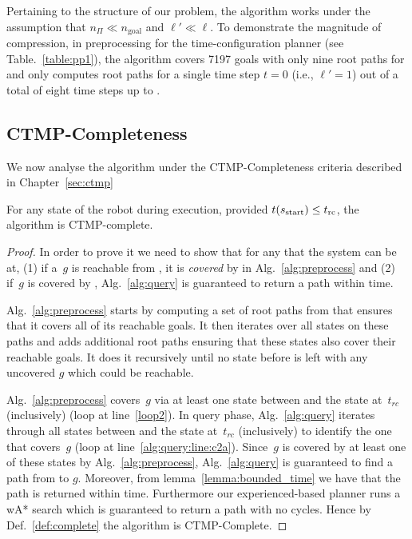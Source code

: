 \documentclass[a4paper]{report}
\begin{document}
Pertaining to the structure of our problem, the algorithm works under the assumption that $n_\Pi \ll n_{\text{goal}}$ and $\ell' \ll \ell$.  To demonstrate the magnitude of compression, in preprocessing for the time-configuration planner (see Table.~\ref{table:pp1}), the algorithm covers 7197 goals with only nine root paths for \Shome and only computes root paths for a single time step $t = 0$ (i.e., $\ell' = 1$) out of a total of eight time steps up to \Trc. 


\subsection{CTMP-Completeness}
We now analyse the algorithm under the CTMP-Completeness criteria described in Chapter~\ref{sec:ctmp}
\vspace{2mm}
\begin{theorem}
For any state \Sstart of the robot during execution, provided $t(s_{\textrm{start}}) \leq t_{\textrm{rc}}$, the algorithm is CTMP-complete.
\end{theorem}

\begin{proof}[Proof]
In order to prove it we need to show that for any \Sstart that the system can be at, (1) if a~$g$ is reachable from \Sstart, it is \emph{covered} by \Sstart in Alg.~\ref{alg:preprocess} and (2) if~$g$ is covered by \Sstart, Alg.~\ref{alg:query} is guaranteed to return a path within \Tbound time.

Alg.~\ref{alg:preprocess} starts by computing a set of root paths from \Shome that ensures that it covers all of its reachable goals. It then iterates over all states on these paths and adds additional root paths ensuring that these states also cover their reachable goals. It does it recursively until no state \Sstart before \Trc is left with any uncovered $g$ which could be reachable.
    
Alg.~\ref{alg:preprocess} covers~$g$ via at least one state between \Sstart and the state at~$t_{rc}$ (inclusively) (loop at line~\ref{loop2}).
In query phase, Alg.~\ref{alg:query} iterates through all states between \Sstart and the state at~$t_{rc}$ (inclusively) to identify the one that covers~$g$ (loop at line~\ref{alg:query:line:c2a}). Since~$g$ is covered by at least one of these states by Alg.~\ref{alg:preprocess}, Alg.~\ref{alg:query} is guaranteed to find a path from \Sstart to $g$.
%
Moreover, from lemma~\ref{lemma:bounded_time} we have that the path is returned within \Tbound time.
%
Furthermore our experienced-based planner runs a wA* search which is guaranteed to return a path with no cycles. Hence by Def.~\ref{def:complete} the algorithm is CTMP-Complete.
\end{proof}
\end{document}
